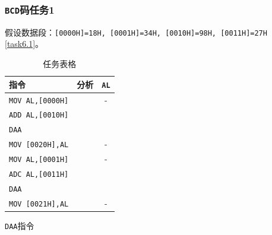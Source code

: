 \documentclass[11pt]{SEU-Digital-Report}
\newcommand{\grayrow}{\rowcolor[rgb]{ .906, .902, .902}}
\begin{document}
\subsubsection{\texttt{BCD}码任务1}
假设数据段：\texttt{[0000H]=18H, [0001H]=34H, [0010H]=98H, [0011H]=27H} \ref{task6.1}。
\begin{table}[htbp]
    \centering
    \caption{任务表格\label{tab:task6.1}}
    \bgroup{}
    \setlength{\tabcolsep}{4.5mm}
        \begin{tabular}{l|c|c}
          \toprule
          \textbf{指令} & \textbf{分析} & \texttt{AL}\\
          \midrule\midrule
          \grayrow  \texttt{MOV AL,[0000H]} & & -\\
                    \texttt{ADD AL,[0010H]} & & \\
          \grayrow  \texttt{DAA} & & \\
                    \texttt{MOV [0020H],AL}& & -\\
          \grayrow  \texttt{MOV AL,[0001H]} & & -\\
                    \texttt{ADC AL,[0011H]} & & \\
          \grayrow  \texttt{DAA} & & \\
                    \texttt{MOV [0021H],AL} & & -\\
          \bottomrule
        \end{tabular}
    \egroup
\end{table}
\begin{analyze}{\texttt{DAA}指令}{}

\end{analyze}
\end{document}

